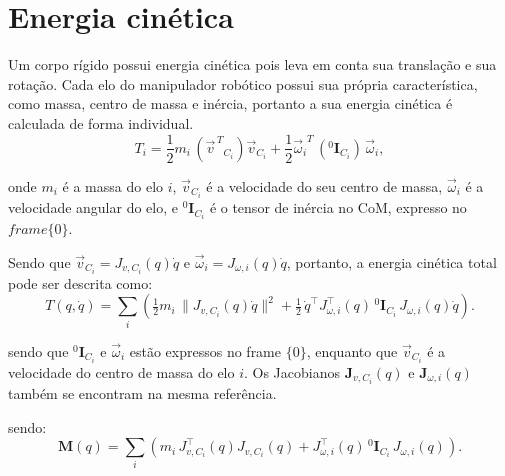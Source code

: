 \section{Energia cinética}
\label{sec:energia_cinetica}
Um corpo rígido possui energia cinética pois leva em conta sua translação e sua rotação.
Cada elo do manipulador robótico possui sua própria característica, como massa, centro de massa e inércia, portanto a sua energia cinética é calculada de forma individual.
\begin{equation}
    \label{eq:energia_elos}
T_i =
\frac{1}{2} m_i \,
({{\vec v}^{\, T}}_{C_i}) \vec{v}_{C_i}
+ \frac{1}{2} {\vec \omega_i}^{T} \, ({}^{0} \mathbf{I}_{C_i}) \, \vec{\omega}_i,
\end{equation}

onde $m_i$ é a massa do elo $i$, $\vec v_{C_i}$ é a velocidade do seu centro de massa,
$\vec\omega_i$ é a velocidade angular do elo, e ${}^{0}\!\mathbf I_{C_i}$ é o tensor de inércia no CoM,
expresso no $frame \{0\}$.

Sendo que
$\vec v_{C_i}=J_{v,C_i}(q)\dot q$ e
$\vec{\omega}_i=J_{\omega,i}(q)\dot q$,
portanto, a energia cinética total pode ser descrita como:
\begin{equation}
\label{eq:T_soma_links} %
T(q,\dot q)=\sum_i\left(\tfrac12 m_i\,\|J_{v,C_i}(q)\dot q\|^2+\tfrac12\,\dot q^{\top}J_{\omega,i}^{\top}(q)\,{}^{0}\!\mathbf I_{C_i}\,J_{\omega,i}(q)\dot q\right).
\end{equation}

sendo que ${}^{0}\!\mathbf I_{C_i}$ e $\vec\omega_i$ estão expressos no frame $\{0\}$, enquanto que $\vec v_{C_i}$ é a velocidade do centro de massa do elo $i$. Os Jacobianos $\mathbf J_{v,C_i}(q)$ e $\mathbf J_{\omega,i}(q)$ também se encontram na mesma referência.

sendo:
\begin{equation}
\label{eq:definicao_Mq} 
\mathbf{M}(q)=\sum_i\left(m_i\,J_{v,C_i}^{\top}(q)J_{v,C_i}(q)+J_{\omega,i}^{\top}(q)\,{}^{0}\!\mathbf I_{C_i}\,J_{\omega,i}(q)\right).
\end{equation}

% 

